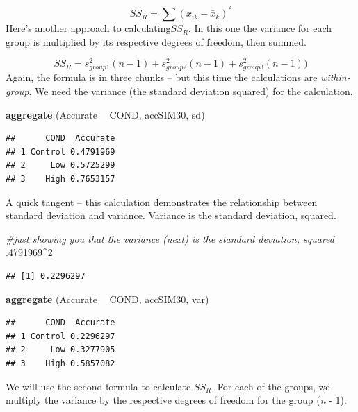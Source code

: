 \documentclass[
  english,
]{book}
\newenvironment{Shaded}{\begin{snugshade}}{\end{snugshade}}
\newcommand{\CommentTok}[1]{\textcolor[rgb]{0.56,0.35,0.01}{\textit{#1}}}
\newcommand{\DecValTok}[1]{\textcolor[rgb]{0.00,0.00,0.81}{#1}}
\newcommand{\FloatTok}[1]{\textcolor[rgb]{0.00,0.00,0.81}{#1}}
\newcommand{\KeywordTok}[1]{\textcolor[rgb]{0.13,0.29,0.53}{\textbf{#1}}}
\newcommand{\NormalTok}[1]{#1}
\newcommand{\OperatorTok}[1]{\textcolor[rgb]{0.81,0.36,0.00}{\textbf{#1}}}
\newcommand{\StringTok}[1]{\textcolor[rgb]{0.31,0.60,0.02}{#1}}
\begin{document}
\[SS_{R}= \sum(x_{ik}-\bar{x}_{k})^{^{2}}\]
Here's another approach to calculating\(SS_R\). In this one the variance for each group is multiplied by its respective degrees of freedom, then summed.

\[SS_{R}= s_{group1}^{2}(n-1) + s_{group2}^{2}(n-1) + s_{group3}^{2}(n-1))\]
Again, the formula is in three chunks -- but this time the calculations are \emph{within-group}. We need the variance (the standard deviation squared) for the calculation.

\begin{Shaded}
\begin{Highlighting}[]
\KeywordTok{aggregate}\NormalTok{ (Accurate }\OperatorTok{~}\StringTok{ }\NormalTok{COND, accSIM30, sd)}
\end{Highlighting}
\end{Shaded}

\begin{verbatim}
##      COND  Accurate
## 1 Control 0.4791969
## 2     Low 0.5725299
## 3    High 0.7653157
\end{verbatim}

A quick tangent -- this calculation demonstrates the relationship between standard deviation and variance. Variance is the standard deviation, squared.

\begin{Shaded}
\begin{Highlighting}[]
\CommentTok{#just showing you that the variance (next) is the standard deviation, squared}
\FloatTok{.4791969}\OperatorTok{^}\DecValTok{2}
\end{Highlighting}
\end{Shaded}

\begin{verbatim}
## [1] 0.2296297
\end{verbatim}

\begin{Shaded}
\begin{Highlighting}[]
\KeywordTok{aggregate}\NormalTok{ (Accurate }\OperatorTok{~}\StringTok{ }\NormalTok{COND, accSIM30, var)}
\end{Highlighting}
\end{Shaded}

\begin{verbatim}
##      COND  Accurate
## 1 Control 0.2296297
## 2     Low 0.3277905
## 3    High 0.5857082
\end{verbatim}

We will use the second formula to calculate \(SS_R\). For each of the groups, we multiply the variance by the respective degrees of freedom for the group (\emph{n} - 1).
\end{document}
